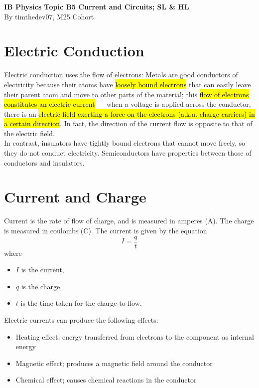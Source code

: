 \documentclass[a4paper,12pt]{article}
\let\oldsection\section
\renewcommand\section{\clearpage\oldsection}
\newcommand{\lb}{\\[8pt]}
\begin{document}
\pagestyle{fancy}


\begin{titlepage}
  \begin{center}

    \vspace*{8cm}
    \textbf{\Large {IB Physics Topic B5 Current and Circuits; SL \& HL}} \\
    \vspace*{1cm}
    \large{By timthedev07, M25 Cohort}


  \end{center}
\end{titlepage}

\pagebreak
\tableofcontents
\pagebreak

\clearpage
\setcounter{page}{1}

\section{Electric Conduction}

Electric conduction uses the flow of electrons: Metals are good conductors of electricity because their atoms have \hl{loosely bound electrons} that can easily leave their parent atom and move to other parts of the material; this \hl{flow of electrons constitutes an electric current} --- when a voltage is applied across the conductor, there is an \hl{electric field exerting a force on the electrons (a.k.a. charge carriers) in a certain direction}. In fact, the direction of the current flow is opposite to that of the electric field. \lb In contrast, insulators have tightly bound electrons that cannot move freely, so they do not conduct electricity. Semiconductors have properties between those of conductors and insulators.

\section{Current and Charge}

Current is the rate of flow of charge, and is measured in amperes (A). The charge is measured in coulombs (C). The current is given by the equation $$I = \frac{q}{t}$$where
\begin{itemize}
  \item $I$ is the current,
  \item $q$ is the charge,
  \item $t$ is the time taken for the charge to flow.
\end{itemize}
Electric currents can produce the following effects:
\begin{itemize}
  \item Heating effect; energy transferred from electrons to the component as internal energy
  \item Magnetic effect; produces a magnetic field around the conductor
  \item Chemical effect; causes chemical reactions in the conductor
\end{itemize}
\end{document}
